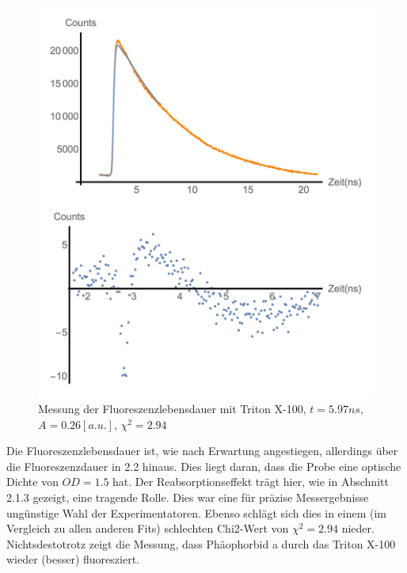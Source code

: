 \documentclass{article}
\begin{document}
\begin{figure}[h]
  \centering
  \includegraphics[width=\textwidth/2]{Bilder/FitTriton.jpg}
  \caption{Messung der Fluoreszenzlebensdauer mit Triton X-100, $t = 5.97ns$, $A = 0.26[a.u.]$, $\chi^2 = 2.94$}
\end{figure}

Die Fluoreszenzlebensdauer ist, wie nach Erwartung angestiegen, allerdings über die Fluoreszenzdauer in 2.2 hinaus. Dies liegt daran, dass
die Probe eine optische Dichte von $OD = 1.5$ hat. Der Reabsorptionseffekt trägt hier, wie in Abschnitt 2.1.3 gezeigt, eine tragende Rolle. Dies war
eine für präzise Messergebnisse ungünstige Wahl der Experimentatoren. Ebenso schlägt sich dies in einem (im Vergleich zu allen anderen Fits)
schlechten Chi2-Wert von $\chi^2=2.94$ nieder. Nichtsdestotrotz zeigt die Messung, dass Phäophorbid a durch das Triton X-100 wieder (besser) fluoresziert.
\end{document}
